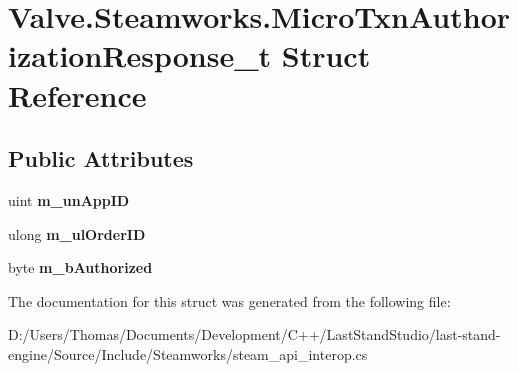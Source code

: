 \hypertarget{structValve_1_1Steamworks_1_1MicroTxnAuthorizationResponse__t}{}\section{Valve.\+Steamworks.\+Micro\+Txn\+Authorization\+Response\+\_\+t Struct Reference}
\label{structValve_1_1Steamworks_1_1MicroTxnAuthorizationResponse__t}
\subsection*{Public Attributes}
\begin{DoxyCompactItemize}
\item 
\hypertarget{structValve_1_1Steamworks_1_1MicroTxnAuthorizationResponse__t_a007bd23df3d4fb6b6041a4eb0f4d1962}{}uint {\bfseries m\+\_\+un\+App\+I\+D}\label{structValve_1_1Steamworks_1_1MicroTxnAuthorizationResponse__t_a007bd23df3d4fb6b6041a4eb0f4d1962}

\item 
\hypertarget{structValve_1_1Steamworks_1_1MicroTxnAuthorizationResponse__t_a719f93f7ca8c64ad20fd6c1d3c167a7c}{}ulong {\bfseries m\+\_\+ul\+Order\+I\+D}\label{structValve_1_1Steamworks_1_1MicroTxnAuthorizationResponse__t_a719f93f7ca8c64ad20fd6c1d3c167a7c}

\item 
\hypertarget{structValve_1_1Steamworks_1_1MicroTxnAuthorizationResponse__t_ac3d947aec0534b8c019a326fb01a7048}{}byte {\bfseries m\+\_\+b\+Authorized}\label{structValve_1_1Steamworks_1_1MicroTxnAuthorizationResponse__t_ac3d947aec0534b8c019a326fb01a7048}

\end{DoxyCompactItemize}


The documentation for this struct was generated from the following file\+:\begin{DoxyCompactItemize}
\item 
D\+:/\+Users/\+Thomas/\+Documents/\+Development/\+C++/\+Last\+Stand\+Studio/last-\/stand-\/engine/\+Source/\+Include/\+Steamworks/steam\+\_\+api\+\_\+interop.\+cs\end{DoxyCompactItemize}
